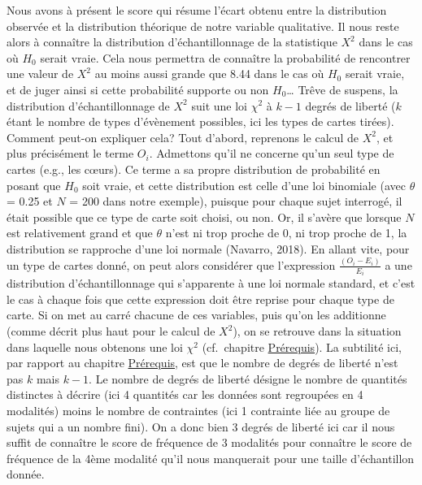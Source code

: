 \documentclass[
  letterpaper,
]{book}
\begin{document}
Nous avons à présent le score qui résume l'écart obtenu entre la
distribution observée et la distribution théorique de notre variable
qualitative. Il nous reste alors à connaître la distribution
d'échantillonnage de la statistique \(X^2\) dans le cas où \(H_{0}\)
serait vraie. Cela nous permettra de connaître la probabilité de
rencontrer une valeur de \(X^2\) au moins aussi grande que 8.44 dans le
cas où \(H_{0}\) serait vraie, et de juger ainsi si cette probabilité
supporte ou non \(H_{0}\)\ldots{} Trêve de suspens, la distribution
d'échantillonnage de \(X^2\) suit une loi \(\chi^2\) à \(k-1\) degrés de
liberté (\(k\) étant le nombre de types d'évènement possibles, ici les
types de cartes tirées). Comment peut-on expliquer cela? Tout d'abord,
reprenons le calcul de \(X^2\), et plus précisément le terme \(O_{i}\).
Admettons qu'il ne concerne qu'un seul type de cartes (e.g., les cœurs).
Ce terme a sa propre distribution de probabilité en posant que \(H_{0}\)
soit vraie, et cette distribution est celle d'une loi binomiale (avec
\(\theta\) = 0.25 et \(N\) = 200 dans notre exemple), puisque pour
chaque sujet interrogé, il était possible que ce type de carte soit
choisi, ou non. Or, il s'avère que lorsque \(N\) est relativement grand
et que \(\theta\) n'est ni trop proche de 0, ni trop proche de 1, la
distribution se rapproche d'une loi normale (Navarro, 2018). En allant
vite, pour un type de cartes donné, on peut alors considérer que
l'expression \(\frac{(O_{i} - E_{i})}{E_{i}}\) a une distribution
d'échantillonnage qui s'apparente à une loi normale standard, et c'est
le cas à chaque fois que cette expression doit être reprise pour chaque
type de carte. Si on met au carré chacune de ces variables, puis qu'on
les additionne (comme décrit plus haut pour le calcul de \(X^2\)), on se
retrouve dans la situation dans laquelle nous obtenons une loi
\(\chi^2\) (cf.~chapitre \hyperref[pruxe9requis]{Prérequis}). La
subtilité ici, par rapport au chapitre
\hyperref[pruxe9requis]{Prérequis}, est que le nombre de degrés de
liberté n'est pas \(k\) mais \(k-1\). Le nombre de degrés de liberté
désigne le nombre de quantités distinctes à décrire (ici 4 quantités car
les données sont regroupées en 4 modalités) moins le nombre de
contraintes (ici 1 contrainte liée au groupe de sujets qui a un nombre
fini). On a donc bien 3 degrés de liberté ici car il nous suffit de
connaître le score de fréquence de 3 modalités pour connaître le score
de fréquence de la 4ème modalité qu'il nous manquerait pour une taille
d'échantillon donnée.
\end{document}
